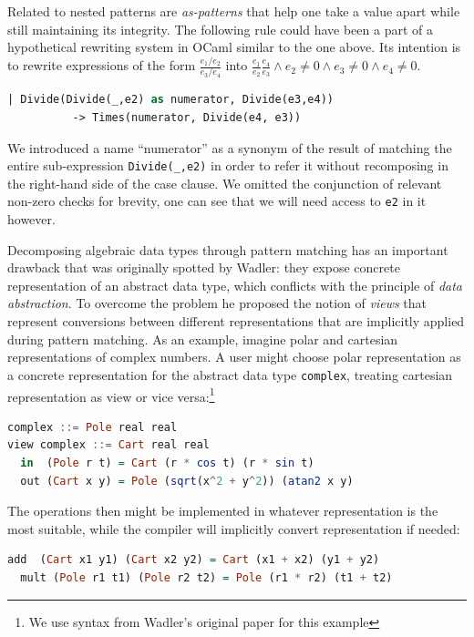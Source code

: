 \documentclass[preprint]{sigplanconf}
\DeclareRobustCommand{\codeocaml}[1]{{\lstinline[breaklines=false,language=Caml]{#1}}}
\begin{document}
Related to nested patterns are \emph{as-patterns} that help one take a value 
apart while still maintaining its integrity. The following rule could have been 
a part of a hypothetical rewriting system in OCaml similar to the one above. Its 
intention is to rewrite expressions of the form $\frac{e_1/e_2}{e_3/e_4}$ into 
$\frac{e_1}{e_2}\frac{e_4}{e_3} \wedge e_2\neq0 \wedge e_3\neq0 \wedge e_4\neq0$.

\begin{lstlisting}[language=Caml,keepspaces,columns=flexible]
    | Divide(Divide(_,e2) as numerator, Divide(e3,e4))
          -> Times(numerator, Divide(e4, e3))
\end{lstlisting}

We introduced a name ``numerator'' as a synonym of the result of matching the 
entire sub-expression \codeocaml{Divide(_,e2)} in order to refer it without 
recomposing in the right-hand side of the case clause. We omitted the 
conjunction of relevant non-zero checks for brevity, one can see that we will 
need access to \codeocaml{e2} in it however.

Decomposing algebraic data types through pattern matching has an important 
drawback that was originally spotted by Wadler\cite{Wadler87}: they expose 
concrete representation of an abstract data type, which conflicts with the 
principle of \emph{data abstraction}. To overcome the problem he proposed the 
notion of \emph{views} that represent conversions between different 
representations that are implicitly applied during pattern matching. As an 
example, imagine polar and cartesian representations of complex numbers. A user 
might choose polar representation as a concrete representation for the abstract 
data type \codeocaml{complex}, treating cartesian representation as view or vice 
versa:\footnote{We use syntax from Wadler's original paper for this example}

\begin{lstlisting}[language=Haskell,columns=flexible]
complex ::= Pole real real
view complex ::= Cart real real
  in  (Pole r t) = Cart (r * cos t) (r * sin t)
  out (Cart x y) = Pole (sqrt(x^2 + y^2)) (atan2 x y)
\end{lstlisting}

The operations then might be implemented in whatever representation is the most 
suitable, while the compiler will implicitly convert representation if needed:

\begin{lstlisting}[language=Haskell,columns=flexible]
  add  (Cart x1 y1) (Cart x2 y2) = Cart (x1 + x2) (y1 + y2)
  mult (Pole r1 t1) (Pole r2 t2) = Pole (r1 * r2) (t1 + t2)
\end{lstlisting}
\end{document}
